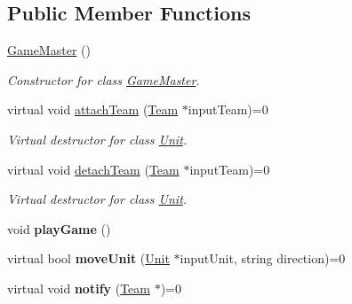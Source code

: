 \subsection*{Public Member Functions}
\begin{DoxyCompactItemize}
\item 
\hypertarget{class_game_master_af68133fd8969aa4ed20ad3009ad8cdb2}{}\hyperlink{class_game_master_af68133fd8969aa4ed20ad3009ad8cdb2}{Game\+Master} ()\label{class_game_master_af68133fd8969aa4ed20ad3009ad8cdb2}

\begin{DoxyCompactList}\small\item\em Constructor for class \hyperlink{class_game_master}{Game\+Master}. \end{DoxyCompactList}\item 
\hypertarget{class_game_master_aad28afc3763a1bfaf95503dc3a4ca7c0}{}virtual void \hyperlink{class_game_master_aad28afc3763a1bfaf95503dc3a4ca7c0}{attach\+Team} (\hyperlink{class_team}{Team} $\ast$input\+Team)=0\label{class_game_master_aad28afc3763a1bfaf95503dc3a4ca7c0}

\begin{DoxyCompactList}\small\item\em Virtual destructor for class \hyperlink{class_unit}{Unit}. \end{DoxyCompactList}\item 
\hypertarget{class_game_master_a638ef26b4c968ba97114ffbbe55810c8}{}virtual void \hyperlink{class_game_master_a638ef26b4c968ba97114ffbbe55810c8}{detach\+Team} (\hyperlink{class_team}{Team} $\ast$input\+Team)=0\label{class_game_master_a638ef26b4c968ba97114ffbbe55810c8}

\begin{DoxyCompactList}\small\item\em Virtual destructor for class \hyperlink{class_unit}{Unit}. \end{DoxyCompactList}\item 
\hypertarget{class_game_master_abe6538e1a4218fcf011b6e21d50bdc5c}{}void {\bfseries play\+Game} ()\label{class_game_master_abe6538e1a4218fcf011b6e21d50bdc5c}

\item 
\hypertarget{class_game_master_a8db72937ffc179ea99040949c3e00723}{}virtual bool {\bfseries move\+Unit} (\hyperlink{class_unit}{Unit} $\ast$input\+Unit, string direction)=0\label{class_game_master_a8db72937ffc179ea99040949c3e00723}

\item 
\hypertarget{class_game_master_ae6e5d34d5e4caa76d32be6f89bf9372e}{}virtual void {\bfseries notify} (\hyperlink{class_team}{Team} $\ast$)=0\label{class_game_master_ae6e5d34d5e4caa76d32be6f89bf9372e}


\end{DoxyCompactItemize}
